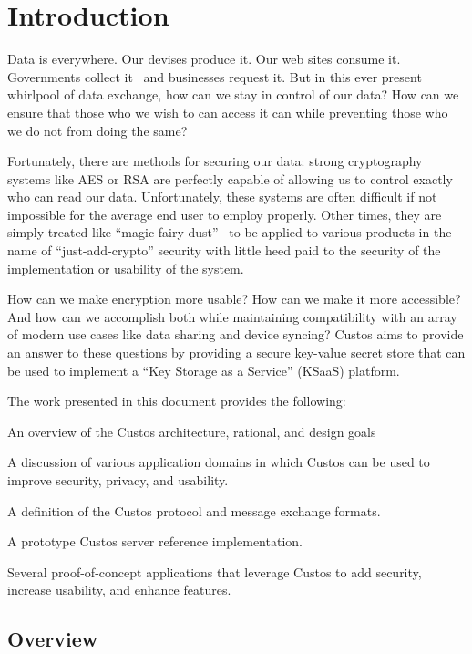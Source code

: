 \chapter{Introduction}
\label{chap:intro}

Data is everywhere. Our devises produce it. Our web sites consume
it. Governments collect it~\cite{GreenwaldPrism} and businesses
request it. But in this ever present whirlpool of data exchange, how
can we stay in control of our data? How can we ensure that those who
we wish to can access it can while preventing those who we do not from
doing the same?

Fortunately, there are methods for securing our data: strong
cryptography systems like AES or RSA are perfectly capable of allowing
us to control exactly who can read our data. Unfortunately, these
systems are often difficult if not impossible for the average end user
to employ properly. Other times, they are simply treated like ``magic
fairy dust''~\cite{Smith2003, schneier2000secrets} to be applied to
various products in the name of ``just-add-crypto'' security with
little heed paid to the security of the implementation or usability of
the system.

How can we make encryption more usable? How can we make it more
accessible? And how can we accomplish both while maintaining
compatibility with an array of modern use cases like data sharing and
device syncing? Custos aims to provide an answer to these questions by
providing a secure key-value secret store that can be used to
implement a ``Key Storage as a Service'' (KSaaS) platform.

The work presented in this document provides the following:

\begin{packed_item}
\item An overview of the Custos architecture, rational, and design goals
\item A discussion of various application domains in which Custos can
  be used to improve security, privacy, and usability.
\item A definition of the Custos protocol and message exchange formats.
\item A prototype Custos server reference implementation.
\item Several proof-of-concept applications that leverage Custos to
  add security, increase usability, and enhance features.
\end{packed_item}

\section{Overview}

